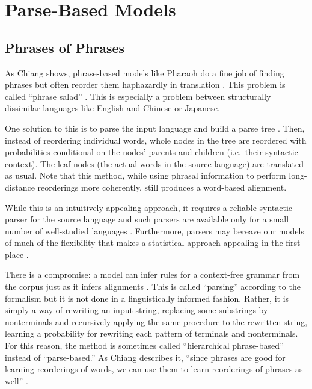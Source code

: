 \documentclass[11pt]{article}
\begin{document}
\section{Parse-Based Models}
\subsection{Phrases of Phrases}
As Chiang shows, phrase-based models like Pharaoh do a fine job of finding phrases
but often reorder them haphazardly in translation \cite{chiang:05}. This problem is called
``phrase salad'' \cite{lopez}. 
This is especially a problem between structurally dissimilar languages like 
English and Chinese or Japanese.

One solution to this is to parse the input language and build a parse tree \cite{yamada_knight}.
Then, instead of reordering individual words, whole nodes in the tree are reordered
with probabilities conditional on the nodes' parents and children (i.e.\ their syntactic context).
The leaf nodes (the actual words in the source language) are translated as usual.
Note that this method, while using phrasal information to perform long-distance reorderings more coherently,
still produces a word-based alignment.

While this is an intuitively appealing approach, it requires a reliable syntactic parser for 
the source language and such parsers are available only for a small number of well-studied languages \cite{lopez}.
Furthermore, parsers may bereave our models of much of the flexibility that makes a statistical
approach appealing in the first place \cite{koehn:03}.

There is a compromise: a model can infer rules for a context-free grammar
from the corpus just as it infers alignments \cite{chiang:05, chiang:07}.
This is called ``parsing'' according to the formalism but it is not done in a linguistically informed fashion. 
Rather, it is simply a way of rewriting an input string, replacing some substrings by nonterminals and 
recursively applying the same procedure to the rewritten string, learning a probability
for rewriting each pattern of terminals and nonterminals.
For this reason, the method is sometimes called ``hierarchical phrase-based'' instead of ``parse-based.''
As Chiang describes it, ``since phrases are good for learning reorderings of words, we can use
them to learn reorderings of phrases as well'' \cite{chiang:05}.
\end{document}
